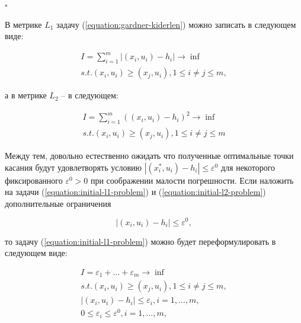 \documentclass[a4paper, 10pt]{article}
\theoremstyle{definition}
\theoremstyle{plain}
\theoremstyle{plain}
\begin{document}
$\square$

В метрике $L_{1}$ задачу (\ref{equation:gardner-kiderlen}) можно записать в
следующем виде:

\begin{equation}
\label{equation:initial-l1-problem}
\begin{split}
 I = \sum \limits_{i = 1}^{m} |(x_{i}, u_{i}) - h_{i}| \to \inf \\
 s. t. (x_{i}, u_{i}) \geq (x_{j}, u_{i}), 1 \leq i \neq j \leq m,
\end{split}
\end{equation}

а в метрике $L_{2}$ -- в следующем:

\begin{equation}
\label{equation:initial-l2-problem}
\begin{split}
 I = \sum \limits_{i = 1}^{m} ((x_{i}, u_{i}) - h_{i})^{2} \to \inf \\
 s. t. (x_{i}, u_{i}) \geq (x_{j}, u_{i}), 1 \leq i \neq j \leq m
\end{split}
\end{equation}

Между тем, довольно естественно ожидать что полученные оптимальные точки касания
будут удовлетворять условию
$|(x^{*}_{i}, u_{i}) - h_{i}| \leq \varepsilon^{0}$
для некоторого фиксированного $\varepsilon^{0} > 0$ при соображении малости
погрешности. Если наложить на задачи (\ref{equation:initial-l1-problem}) и
(\ref{equation:initial-l2-problem}) дополнительные ограничения

\begin{equation}
\label{equation:additional-constraints}
 |(x_{i}, u_{i}) - h_{i}| \leq \varepsilon^{0},
\end{equation}

то задачу (\ref{equation:initial-l1-problem}) можно будет переформулировать в
следующем виде:

\begin{equation}
\label{equation:reduced-l1-problem}
\begin{split}
 I = \varepsilon_{1} + \ldots + \varepsilon_{m} \to \inf \\
 s. t. (x_{i}, u_{i}) \geq (x_{j}, u_{i}), 1 \leq i \neq j \leq m, \\
 | (x_{i}, u_{i}) - h_{i} | \leq \varepsilon_{i}, i = 1, \ldots, m, \\
 0 \leq \varepsilon_{i} \leq \varepsilon^{0}, i = 1, \ldots, m,
\end{split}
\end{equation}
\end{document}
